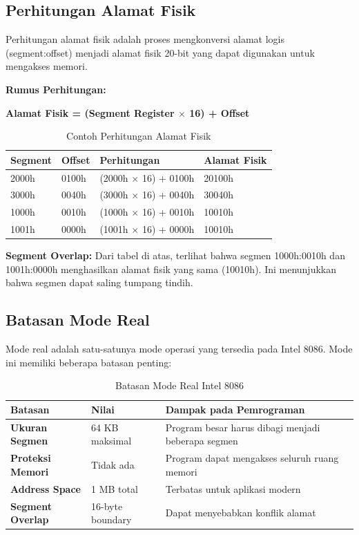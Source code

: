 \documentclass[../main.tex]{subfiles}
\begin{document}
\subsection{Perhitungan Alamat Fisik}
Perhitungan alamat fisik adalah proses mengkonversi alamat logis (segment:offset) menjadi alamat fisik 20-bit yang dapat digunakan untuk mengakses memori.

\textbf{Rumus Perhitungan:}
\begin{center}
\textbf{Alamat Fisik = (Segment Register $\times$ 16) + Offset}
\end{center}

\begin{table}[h]
\centering
\caption{Contoh Perhitungan Alamat Fisik}
\begin{tabular}{|p{3cm}|p{3cm}|p{3cm}|p{6cm}|}
\hline
\textbf{Segment} & \textbf{Offset} & \textbf{Perhitungan} & \textbf{Alamat Fisik} \\
\hline
2000h & 0100h & (2000h $\times$ 16) + 0100h & 20100h \\
\hline
3000h & 0040h & (3000h $\times$ 16) + 0040h & 30040h \\
\hline
1000h & 0010h & (1000h $\times$ 16) + 0010h & 10010h \\
\hline
1001h & 0000h & (1001h $\times$ 16) + 0000h & 10010h \\
\hline
\end{tabular}
\label{tab:physical-address-calculation}
\end{table}

\textbf{Segment Overlap:}
Dari tabel di atas, terlihat bahwa segmen 1000h:0010h dan 1001h:0000h menghasilkan alamat fisik yang sama (10010h). Ini menunjukkan bahwa segmen dapat saling tumpang tindih.

\subsection{Batasan Mode Real}
Mode real adalah satu-satunya mode operasi yang tersedia pada Intel 8086. Mode ini memiliki beberapa batasan penting:

\begin{table}[h]
\centering
\caption{Batasan Mode Real Intel 8086}
\begin{tabular}{|p{3cm}|p{4cm}|p{8cm}|}
\hline
\textbf{Batasan} & \textbf{Nilai} & \textbf{Dampak pada Pemrograman} \\
\hline
\textbf{Ukuran Segmen} & 64 KB maksimal & Program besar harus dibagi menjadi beberapa segmen \\
\hline
\textbf{Proteksi Memori} & Tidak ada & Program dapat mengakses seluruh ruang memori \\
\hline
\textbf{Address Space} & 1 MB total & Terbatas untuk aplikasi modern \\
\hline
\textbf{Segment Overlap} & 16-byte boundary & Dapat menyebabkan konflik alamat \\
\hline
\end{tabular}
\label{tab:real-mode-limitations}
\end{table}
\end{document}
